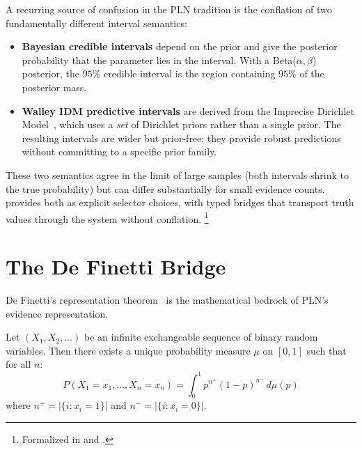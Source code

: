 \documentclass[11pt,openany]{report}
\begin{document}
A recurring source of confusion in the PLN tradition is the conflation
of two fundamentally different interval semantics:

\begin{itemize}
\item \textbf{Bayesian credible intervals} depend on the prior and give
  the posterior probability that the parameter lies in the interval.
  With a Beta($\alpha, \beta$) posterior, the $95\%$ credible interval
  is the region containing $95\%$ of the posterior mass.

\item \textbf{Walley IDM predictive intervals} are derived from the
  Imprecise Dirichlet Model~\cite{Walley1996BagOfMarbles}, which uses
  a \emph{set} of Dirichlet priors rather than a single prior.  The
  resulting intervals are wider but prior-free: they provide robust
  predictions without committing to a specific prior family.
\end{itemize}

These two semantics agree in the limit of large samples (both intervals
shrink to the true probability) but can differ substantially for small
evidence counts.  \xiPLN{} provides both as explicit selector choices,
with typed bridges that transport truth values through the system
without conflation.%
\footnote{Formalized in  and
  .}

\section{The De Finetti Bridge}

De Finetti's representation theorem~\cite{definetti1937} is the
mathematical bedrock of PLN's evidence representation.

\begin{theorem}
Let $(X_1, X_2, \ldots)$ be an infinite exchangeable sequence of
binary random variables.  Then there exists a unique probability
measure $\mu$ on $[0,1]$ such that for all $n$:
\[
  P(X_1 = x_1, \ldots, X_n = x_n) =
  \int_0^1 p^{n^+}(1-p)^{n^-}\, d\mu(p)
\]
where $n^+ = |\{i : x_i = 1\}|$ and $n^- = |\{i : x_i = 0\}|$.
\end{theorem}
\end{document}

